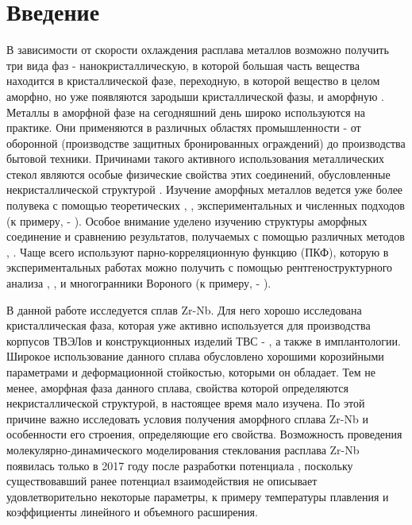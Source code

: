 \chapter*{Введение}

В зависимости от скорости охлаждения расплава металлов возможно получить три вида фаз - нанокристаллическую, в которой большая часть вещества находится в кристаллической фазе, переходную, в которой вещество в целом аморфно, но уже появляются зародыши кристаллической фазы, и аморфную {\cite{Zolotukhin}}. Металлы в аморфной фазе на сегодняшний день широко используются на практике. Они применяются в различных областях промышленности - от оборонной (производстве защитных бронированных  ограждений) до производства бытовой техники. Причинами такого активного использования металлических стекол являются особые физические свойства этих соединений, обусловленные некристаллической структурой {\cite{Zolotukhin}}. Изучение аморфных металлов ведется уже более полувека с помощью теоретических \cite{Egami}, \cite{Gaskell}, экспериментальных \cite{Waseda} и численных подходов (к примеру, \cite{Pisarev} -  \cite{Kolotova}). Особое внимание уделено изучению структуры аморфных соединение и сравнению результатов, получаемых с помощью различных методов \cite{Reddy}, \cite{Sheng}. Чаще  всего используют парно-корреляционную функцию (ПКФ), которую в экспериментальных работах можно получить с помощью рентгеноструктурного анализа \cite{Waseda}, \cite{Liu}, \cite{Hoare} и многогранники Вороного (к примеру,\cite{Wei} -  \cite{Evteev}).

В данной работе исследуется сплав  Zr-Nb. Для него хорошо исследована кристаллическая фаза, которая уже активно используется  для производства корпусов ТВЭЛов и конструкционных изделий ТВС \cite{Gordeev} - \cite{Derevyako},  а также в имплантологии. Широкое использование данного сплава обусловлено хорошими корозийными параметрами и деформационной стойкостью, которыми он обладает. Тем не менее, аморфная фаза данного сплава, свойства которой определяются некристаллической структурой, в настоящее время мало изучена. По этой причине важно исследовать условия получения аморфного сплава Zr-Nb и особенности его строения, определяющие его свойства.  Возможность проведения молекулярно-динамического моделирования стеклования расплава Zr-Nb появилась только в 2017 году после разработки потенциала  \cite{Smirnova}, поскольку существовавший ранее потенциал взаимодействия \cite{lin2013n} не описывает удовлетворительно некоторые параметры, к примеру температуры плавления и коэффициенты линейного и объемного расширения.
